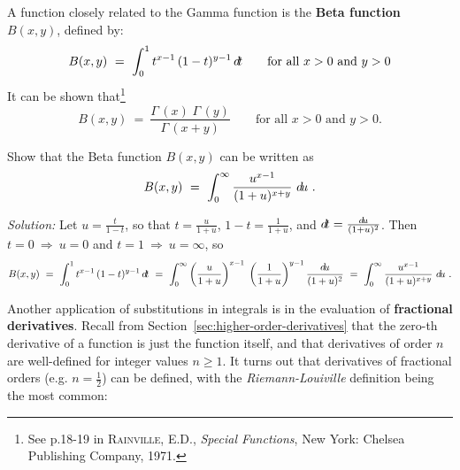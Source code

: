 A function closely related to the Gamma function is the \textbf{Beta function}
$B(x,y)$, defined by:
\begin{equation}
B(x,y) ~=~ \int_0^1 t^{x-1}\,(1-t)^{y-1}\,d\!t \qquad\text{for all $x > 0$ and $y > 0$}
\end{equation}
It can be shown that\footnote{See p.18-19 in \textsc{Rainville, E.D.},
\emph{Special Functions}, New York: Chelsea Publishing Company, 1971.}
\begin{equation}\label{eqn:betagamma}
B(x,y) ~=~ \frac{\Gamma\,(x)\;\Gamma\,(y)}{\Gamma\,(x+y)}
\qquad\text{for all $x > 0$ and $y > 0$.}
\end{equation}
\begin{exmp}\label{exmp:intbeta1}
\noindent Show that the Beta function $B(x,y)$ can be written as
\[
B(x,y) ~=~ \int_0^{\infty} \frac{u^{x-1}}{(1+u)^{x+y}}~d\!u ~.
\]
\par\noindent\emph{Solution:} Let $u=\frac{t}{1-t}$, so that $t=\frac{u}{1+u}$,
$1-t=\frac{1}{1+u}$, and $d\!t = \frac{d\!u}{(1+u)^2}$. Then $t=0~\Rightarrow~u=0$
and $t=1~\Rightarrow~u=\infty$, so
\[
B(x,y) ~=~ \int_0^1 t^{x-1}\,(1-t)^{y-1}\,d\!t
~=~ \int_0^{\infty} \left(\frac{u}{1+u}\right)^{x-1}\;\left(\frac{1}{1+u}\right)^{y-1}
    \frac{d\!u}{(1+u)^2}
~=~ \int_0^{\infty} \frac{u^{x-1}}{(1+u)^{x+y}}~d\!u ~.
\]
\end{exmp}
\divider
\newpage
Another application of substitutions in integrals is in the evaluation of
\textbf{fractional derivatives}. Recall from
Section~\ref{sec:higher-order-derivatives} that the zero-th derivative of a function is just the function
itself, and that derivatives of order $n$ are well-defined for integer values
$n \ge 1$. It turns out that derivatives of fractional orders (e.g.
$n=\frac{1}{2}$) can
be defined, with the \emph{Riemann-Louiville} definition being the most
common:


